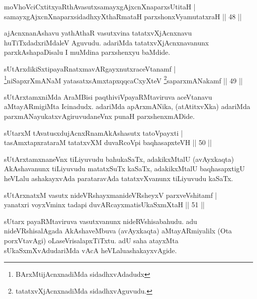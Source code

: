 \begin{shl}
moVhoVciCxtitxyaRthAvasutxsamayxgAjxcnXnaparxsUtitaH |\\
samayxgAjxcnXnaparxsidadhxyXthaRmataH parxshonxV\s yamutatxraH \hfill || 48 ||
\end{shl}

\begin{artha}
ajAcnxnanAshavu yathAthaR vasutxvina tatatxvXjAcnxnavu huTiTxdadxriMdaleV Aguvudu. adariMda tatatxvXjAcnxnavanunx parxkAshapaDisalu I muMdina parxshenxyu baMdide.
\end{artha}

\begin{shl}
sUtArxdikiSxtipayaRnatxmavARgayxnutxraceVtanamf |\\
\footnote{BArxMtijAcnxnadiMda sidadhxvAdadudx}niSapxrXmANaM yatasatxsAmxtapxqqcaCxyXteV \footnote{tatatxvXjAcnxnadiMda sidadhxvAguvudu.}saparxmANakamf \hfill || 49 ||
\end{shl}

\begin{artha}
sUtArxtamxniMda AraMBisi paqthiviVpayaRMtaviruva aceVtanavu aMtayARmigiMta Icinadudx. adariMda apArxmANika, (atAtitxvXka) adariMda parxmANayukatxvAgiruvudaneVnx punaH parxshenxmADide.
\end{artha}


\begin{shl}
sUtarxM tAvatusxdujAcnxRnamAkAshasutx tatoV\s payxti |\\
tasAmxtapxrataraM tatatxvXM duvaRcoV\s pi baqhasapxteVH \hfill || 50 ||
\end{shl}

\begin{artha}
sUtArxtamxnaneVnx tiLiyuvudu bahukaSaTx, adakikxMtalU (avAyxkaqta) AkAshavanunx tiLiyuvudu matatxSuTx kaSaTx, adakikxMtalU baqhasapxtigU heVLalu ashakayxvAda parataravAda tatatxvXvanunx tiLiyuvudu kaSaTx.
\end{artha}


\begin{shl}
sUtArxnatxM vasutx nideVRshayxmanideVRsheyxV parxveVshitamf |\\
yanatxri voyxVminx tadapi duvARcayxmatisUkaSxmXtaH \hfill || 51 ||
\end{shl}

\begin{artha}
sUtarx payaRMtaviruva vasutxvanunx nideRVshisabahudu. adu nideVRshisalAgada AkAshaveMbuva (avAyxkaqta) aMtayARmiyalilx (Ota porxVtavAgi) oLaseVrisalapxTiTxtu. adU saha atayxMta sUkaSxmXvAdudariMda vAcA heVLalu\break ashakayxvAgide.
\end{artha}


